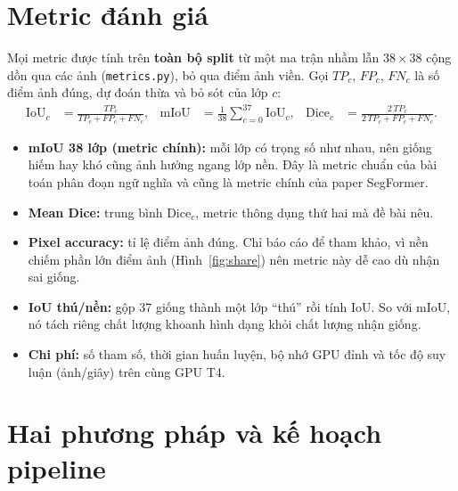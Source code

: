 \documentclass[12pt]{article}
\newcommand{\code}[1]{\texttt{#1}}
\newcommand{\st}[1]{\textbf{#1}}
\begin{document}
\section{Metric đánh giá}\label{sec:metrics}
Mọi metric được tính trên \st{toàn bộ split} từ một ma trận nhầm lẫn $38\times38$ cộng dồn qua các ảnh (\code{metrics.py}),
bỏ qua điểm ảnh viền. Gọi $TP_c$, $FP_c$, $FN_c$ là số điểm ảnh đúng, dự đoán thừa và bỏ sót của lớp $c$:
\begin{align*}
\mathrm{IoU}_c &= \frac{TP_c}{TP_c + FP_c + FN_c}, &
\mathrm{mIoU} &= \frac{1}{38}\sum_{c=0}^{37}\mathrm{IoU}_c, &
\mathrm{Dice}_c &= \frac{2\,TP_c}{2\,TP_c + FP_c + FN_c}.
\end{align*}
\begin{itemize}
  \item \st{mIoU 38 lớp (metric chính):} mỗi lớp có trọng số như nhau, nên giống hiếm hay khó cũng ảnh hưởng ngang lớp nền.
        Đây là metric chuẩn của bài toán phân đoạn ngữ nghĩa và cũng là metric chính của paper SegFormer.
  \item \st{Mean Dice:} trung bình $\mathrm{Dice}_c$, metric thông dụng thứ hai mà đề bài nêu.
  \item \st{Pixel accuracy:} tỉ lệ điểm ảnh đúng. Chỉ báo cáo để tham khảo, vì nền chiếm phần lớn điểm ảnh (Hình~\ref{fig:share})
        nên metric này dễ cao dù nhận sai giống.
  \item \st{IoU thú/nền:} gộp 37 giống thành một lớp ``thú'' rồi tính IoU. So với mIoU, nó tách riêng chất lượng khoanh hình
        dạng khỏi chất lượng nhận giống.
  \item \st{Chi phí:} số tham số, thời gian huấn luyện, bộ nhớ GPU đỉnh và tốc độ suy luận (ảnh/giây) trên cùng GPU T4.
\end{itemize}

\section{Hai phương pháp và kế hoạch pipeline}
\end{document}
